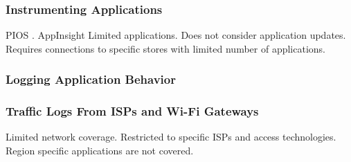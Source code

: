 \subsubsection{Instrumenting Applications}
PIOS \cite{egele:pios}.
AppInsight \cite{ravindranath:appinsight}
Limited applications.
Does not consider application updates. 
Requires connections to specific stores with limited number of applications. 

\subsubsection{Logging Application Behavior}
\cite{falaki:smartphoneusage}

\subsubsection{Traffic Logs From ISPs and Wi-Fi Gateways}
Limited network coverage. 
Restricted to specific ISPs and access technologies. 
Region specific applications are not covered. 


